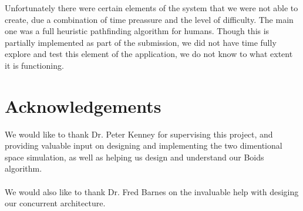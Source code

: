 \documentclass[10pt, a4paper, conference, compsocconf]{IEEEtran}
\begin{document}
Unfortunately there were certain elements of the system that we were not able to create, due a combination of time preassure and the level of difficulty. The main one was a full heuristic pathfinding algorithm for humans. Though this is partially implemented as part of the submission, we did not have time fully explore and test this element of the application, we do not know to what extent it is functioning.

\section{Acknowledgements}
We would like to thank Dr. Peter Kenney for supervising this project, and providing valuable input on designing and implementing the two dimentional space simulation, as well as helping us design and understand our Boids algorithm.\\
\\
We would also like to thank Dr. Fred Barnes on the invaluable help with desiging our concurrent architecture.

\end{document}
